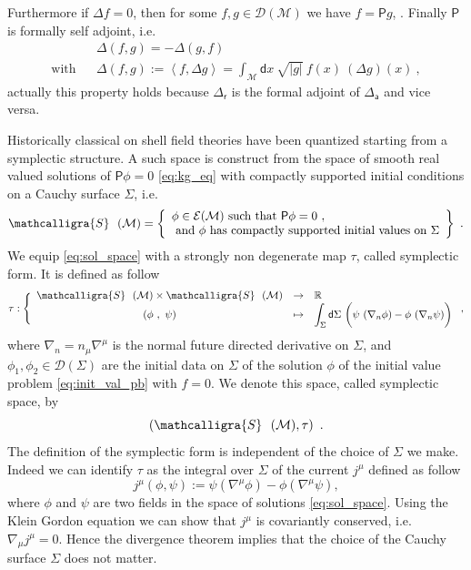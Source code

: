 \documentclass[11pt]{book}
\newcommand{\bigint}{\displaystyle\int}
\newcommand{\abs}[1]{\left|#1\right|}
\newcommand{\sm}[1]{\left\langle#1\right\rangle}
\newcommand{\Dcal}{\mathcal{D}}
\newcommand{\Ecal}{\mathcal{E}}
\newcommand{\Mcal}{\mathcal{M}}
\newcommand{\Rbb}{\mathbb{R}}
\newcommand{\Psf}{\mathsf{P}}
\newcommand{\asf}{\mathsf{a}}
\newcommand{\dsf}{\mathsf{d}}
\newcommand{\rsf}{\mathsf{r}}
\theoremstyle{break}
\begin{document}
Furthermore if $\Delta f = 0$, then for some $f, g\in\Dcal(\Mcal)$ we have $f = \Psf g$, . Finally $\Psf$ is formally self adjoint, i.e. 
%
\begin{eqnarray}
&&\Delta(f,g) = - \Delta(g,f) \\
%
\mbox{with} && \Delta(f,g) := \sm{f,\Delta g} = \int_\Mcal \dsf x \ \sqrt{\abs{g}} \ f(x) \ \left(\Delta g\right)(x) \ , \nonumber
\label{eq:smearing}
\end{eqnarray}
%
actually this property holds because $\Delta_\rsf$ is the formal adjoint of $\Delta_\asf$ and vice versa.


\bigskip


Historically classical on shell field theories have been quantized starting from a symplectic structure. A such space is construct from the space of smooth real valued solutions of $\Psf \phi = 0$ \eqref{eq:kg_eq} with compactly supported initial conditions on a Cauchy surface $\Sigma$, i.e.
%
\begin{equation}
\mathcalligra{S} \ \ (\Mcal) = \left\{ 
\begin{array}{l}
\phi \in \Ecal(\Mcal) \mbox{ such that } \Psf\phi=0 \ , \\
\mbox{ and } \phi \mbox{ has compactly supported initial values on } \Sigma 
\end{array}
\right\} \ .
\label{eq:sol_space}
\end{equation}
%
We equip \eqref{eq:sol_space} with a strongly non degenerate map $\tau$, called symplectic form. It is defined as follow
%
\begin{equation*}
\tau : \Bigg\{
\begin{array}{ccl}
\mathcalligra{S} \ \ (\Mcal) \times \mathcalligra{S} \ \ (\Mcal) & \to & \Rbb \\
(\phi \ , \ \psi) & \mapsto & \bigint_\Sigma  \dsf \Sigma \ \bigg( \psi \ (\nabla_n \phi) - \phi \ (\nabla_n \psi) \bigg)
\end{array}
\ ,
\end{equation*}
%
where $\nabla_n = n_\mu \nabla^\mu$ is the normal future directed derivative on $\Sigma$, and $\phi_1, \phi_2 \in \Dcal(\Sigma)$  are the initial data on $\Sigma$ of the solution $\phi$ of the initial value problem \eqref{eq:init_val_pb} with $f=0$. We denote this space, called symplectic space, by 
%
\begin{equation*}
\left(\mathcalligra{S} \ \ (\Mcal),\tau\right) \ . 
\end{equation*}
%
The definition of the symplectic form is independent of the choice of $\Sigma$ we make. Indeed we can identify $\tau$ as the integral over $\Sigma$ of the current $j^\mu$ defined as follow
%
\begin{equation*}
j^\mu (\phi,\psi) := \psi (\nabla^\mu \phi) - \phi (\nabla^\mu \psi),  
\label{eq:current}
\end{equation*}
%
where $\phi$ and $\psi$ are two fields in the space of solutions \eqref{eq:sol_space}. Using the Klein Gordon equation we can show that $j^\mu$ is covariantly conserved, i.e. $\nabla_\mu j^\mu = 0$. Hence the divergence theorem implies that the choice of the Cauchy surface $\Sigma$ does not matter. 
\end{document}
